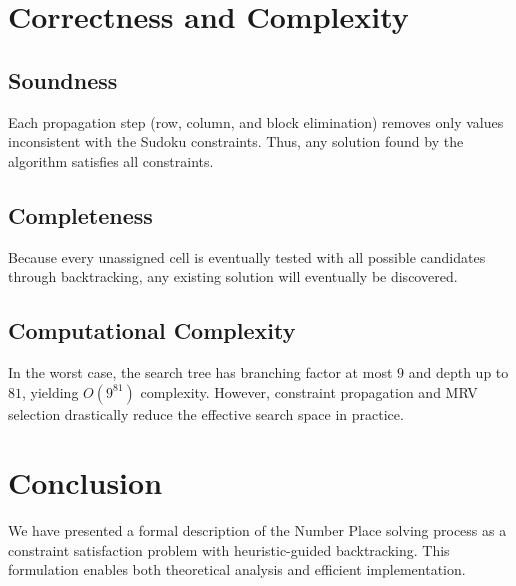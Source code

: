 \documentclass[a4paper,11pt]{article}
\begin{document}
\section{Correctness and Complexity}

\subsection{Soundness}
Each propagation step (row, column, and block elimination) removes only values inconsistent with the Sudoku constraints.
Thus, any solution found by the algorithm satisfies all constraints.

\subsection{Completeness}
Because every unassigned cell is eventually tested with all possible candidates through backtracking, any existing solution will eventually be discovered.

\subsection{Computational Complexity}
In the worst case, the search tree has branching factor at most \(9\) and depth up to \(81\), yielding \(O(9^{81})\) complexity.
However, constraint propagation and MRV selection drastically reduce the effective search space in practice.

\section{Conclusion}
We have presented a formal description of the Number Place solving process as a constraint satisfaction problem with heuristic-guided backtracking.
This formulation enables both theoretical analysis and efficient implementation.
\end{document}
